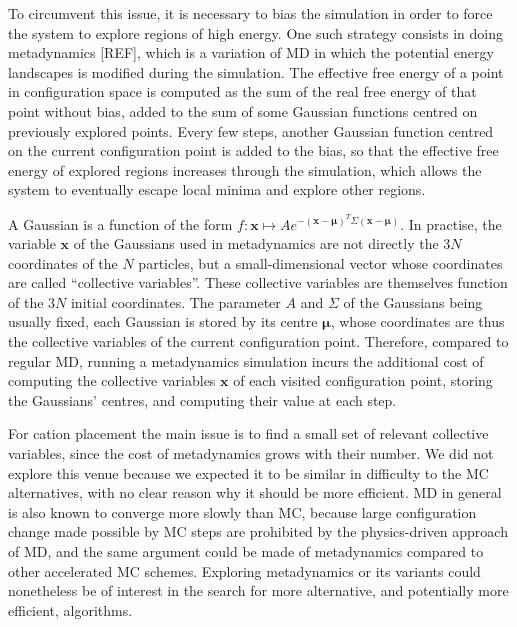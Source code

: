 \documentclass[main.tex]{subfiles}
\begin{document}
To circumvent this issue, it is necessary to bias the simulation in order to force the system to explore regions of high energy. One such strategy consists in doing metadynamics [REF], which is a variation of MD in which the potential energy landscapes is modified during the simulation. The effective free energy of a point in configuration space is computed as the sum of the real free energy of that point without bias, added to the sum of some Gaussian functions centred on previously explored points. Every few steps, another Gaussian function centred on the current configuration point is added to the bias, so that the effective free energy of explored regions increases through the simulation, which allows the system to eventually escape local minima and explore other regions.

A Gaussian is a function of the form $f:\mathbf x\mapsto Ae^{-(\mathbf x - \mathbf\mu)^T\Sigma(\mathbf x - \mathbf\mu)}$. In practise, the variable $\mathbf x$ of the Gaussians used in metadynamics are not directly the $3N$ coordinates of the $N$ particles, but a small-dimensional vector whose coordinates are called ``collective variables''. These collective variables are themselves function of the $3N$ initial coordinates. The parameter $A$ and $\Sigma$ of the Gaussians being usually fixed, each Gaussian is stored by its centre $\mathbf\mu$, whose coordinates are thus the collective variables of the current configuration point. Therefore, compared to regular MD, running a metadynamics simulation incurs the additional cost of computing the collective variables $\mathbf x$ of each visited configuration point, storing the Gaussians' centres, and computing their value at each step.

For cation placement the main issue is to find a small set of relevant collective variables, since the cost of metadynamics grows with their number. We did not explore this venue because we expected it to be similar in difficulty to the MC alternatives, with no clear reason why it should be more efficient. MD in general is also known to converge more slowly than MC, because large configuration change made possible by MC steps are prohibited by the physics-driven approach of MD, and the same argument could be made of metadynamics compared to other accelerated MC schemes. Exploring metadynamics or its variants could nonetheless be of interest in the search for more alternative, and potentially more efficient, algorithms.
\end{document}
